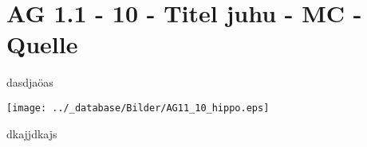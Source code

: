 \section{AG 1.1 - 10 - Titel juhu - MC - Quelle}

\begin{beispiel}[AG 1.1]{1}
dasdjaöas

\texttt{[image: ../\_database/Bilder/AG11\_10\_hippo.eps]}


dkajjdkajs

\end{beispiel}